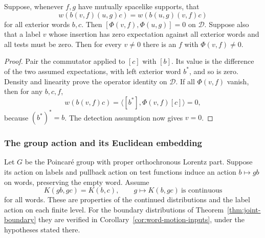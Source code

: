 \begin{proposition}\label{prop:word-locality}
Suppose, whenever $f,g$ have mutually spacelike supports, that
\[
 w(b(v,f)(u,g)c)=w(b(u,g)(v,f)c)
\]
for all exterior words $b,c$. Then
$[\Phi(v,f),\Phi(u,g)]=0$ on $\mathcal D$.
Suppose also that a label $v$ whose insertion has zero expectation against
all exterior words and all tests must be zero. Then for every $v\ne0$
there is an $f$ with $\Phi(v,f)\ne0$.
\end{proposition}
\begin{proof}
Pair the commutator applied to $[c]$ with $[b]$. Its value is the difference
of the two assumed expectations, with left exterior word $b^*$, and so is
zero. Density and linearity prove the operator identity on $\mathcal D$.
If all $\Phi(v,f)$ vanish, then for any $b,c,f$,
\[
 w(b(v,f)c)=\langle[b^*],\Phi(v,f)[c]\rangle=0,
\]
because $(b^*)^*=b$. The detection assumption now gives $v=0$.
\end{proof}

\subsubsection{The group action and its Euclidean embedding}
Let $G$ be the Poincar\'e group with proper orthochronous Lorentz part. Suppose its action on labels
and pullback action on test functions induce an action $b\mapsto gb$ on
words, preserving the empty word. Assume
\begin{equation}\label{eq:word-motion-input}
 K(gb,gc)=K(b,c),\qquad g\longmapsto K(b,gc)\ \text{is continuous}
\end{equation}
for all words. These are properties of the continued distributions and the
label action on each finite level. For the boundary distributions of
Theorem~\ref{thm:joint-boundary} they are verified in
Corollary~\ref{cor:word-motion-inputs}, under the hypotheses stated there.

